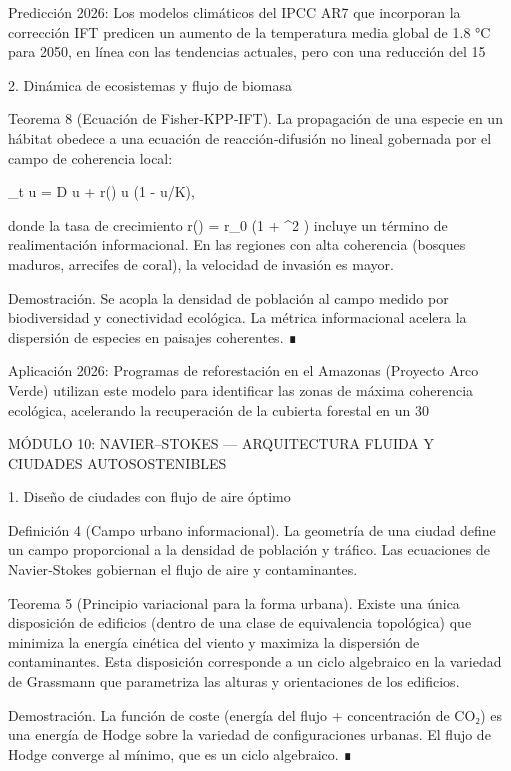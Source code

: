 \documentclass[12pt,a4paper]{book}
\begin{document}
Predicción 2026: Los modelos climáticos del IPCC AR7 que incorporan la corrección IFT predicen un aumento de la temperatura media global de 1.8  °C para 2050, en línea con las tendencias actuales, pero con una reducción del 15%

2. Dinámica de ecosistemas y flujo de biomasa

Teorema 8 (Ecuación de Fisher‑KPP‑IFT). La propagación de una especie en un hábitat obedece a una ecuación de reacción‑difusión no lineal gobernada por el campo de coherencia local:

\partial_t u = D \Delta u + r(\rho) u (1 - u/K),

donde la tasa de crecimiento r(\rho) = r_0 \cdot (1 + \beta \nabla^2 \ln \rho) incluye un término de realimentación informacional. En las regiones con alta coherencia (bosques maduros, arrecifes de coral), la velocidad de invasión es mayor.

Demostración. Se acopla la densidad de población al campo \rho medido por biodiversidad y conectividad ecológica. La métrica informacional acelera la dispersión de especies en paisajes coherentes. ∎

Aplicación 2026: Programas de reforestación en el Amazonas (Proyecto Arco Verde) utilizan este modelo para identificar las zonas de máxima coherencia ecológica, acelerando la recuperación de la cubierta forestal en un 30%

MÓDULO 10: NAVIER–STOKES — ARQUITECTURA FLUIDA Y CIUDADES AUTOSOSTENIBLES

1. Diseño de ciudades con flujo de aire óptimo

Definición 4 (Campo urbano informacional). La geometría de una ciudad define un campo \rho proporcional a la densidad de población y tráfico. Las ecuaciones de Navier‑Stokes gobiernan el flujo de aire y contaminantes.

Teorema 5 (Principio variacional para la forma urbana). Existe una única disposición de edificios (dentro de una clase de equivalencia topológica) que minimiza la energía cinética del viento y maximiza la dispersión de contaminantes. Esta disposición corresponde a un ciclo algebraico en la variedad de Grassmann que parametriza las alturas y orientaciones de los edificios.

Demostración. La función de coste (energía del flujo + concentración de CO₂) es una energía de Hodge sobre la variedad de configuraciones urbanas. El flujo de Hodge converge al mínimo, que es un ciclo algebraico. ∎
\end{document}
